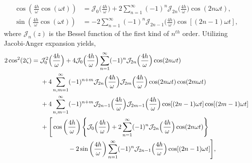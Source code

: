 \documentclass[12pt]{iopart}
\begin{document}
\begin{align*}
\cos(\frac{4h}{\omega}\cos(\omega t)) &= \mathcal{J}_0\Big(\frac{4h}{\omega}\Big) + 2 \sum_{n=1}^\infty (-1)^n \mathcal{J}_{2n}\Big(\frac{4h}{\omega}\Big)\cos(2n\omega t),\\
\sin(\frac{4h}{\omega}\cos(\omega t)) &=-2 \sum_{n=1}^\infty (-1)^n \mathcal{J}_{2n-1}\Big(\frac{4h}{\omega}\Big)\cos[(2n-1)\omega t],
\end{align*}
where $\mathcal{J}_n(z)$ is the Bessel function of the first kind of $n^{th}$ order. Utilizing Jacobi-Anger expansion yields,
\begin{align}
2\cos^2(2\zeta)
&= \mathcal{J}^2_0\Big(\frac{4h}{\omega}\Big) + 4\mathcal{J}_0\Big(\frac{4h}{\omega}\Big)\sum_{n=1}^\infty (-1)^n \mathcal{J}_{2n}\Big(\frac{4h}{\omega}\Big)\cos(2n\omega t)\nonumber\\
&\hspace{0.5cm}+4\sum_{n,m=1}^\infty(-1)^{n+m}\mathcal{J}_{2n}\Big(\frac{4h}{\omega}\Big)\mathcal{J}_{2m}\Big(\frac{4h}{\omega}\Big) \cos(2n\omega t)\cos(2m\omega t)\nonumber\\
&\hspace{0.5cm}+4 \sum_{n,m=1}^\infty (-1)^{n+m} \mathcal{J}_{2n-1}\Big(\frac{4h}{\omega}\Big)\mathcal{J}_{2m-1}\Big(\frac{4h}{\omega}\Big)\cos[(2n-1)\omega t]\cos[(2m-1)\omega t]\nonumber\\
&\hspace{0.5cm}+\Bigg[\cos\left(\frac{4h}{\omega}\right)\left\{\mathcal{J}_0\Big(\frac{4h}{\omega}\Big) + 2 \sum_{n=1}^\infty (-1)^n \mathcal{J}_{2n}\Big(\frac{4h}{\omega}\Big)\cos(2n\omega t)\right\}\nonumber\\
&\hspace{2.0cm}-2\sin\left(\frac{4h}{\omega}\right) \sum_{n=1}^\infty(-1)^n \mathcal{J}_{2n-1}\Big(\frac{4h}{\omega}\Big)\cos[(2n-1)\omega t]\Bigg],
\label{eq:cossqr2}
\end{align}
\end{document}
